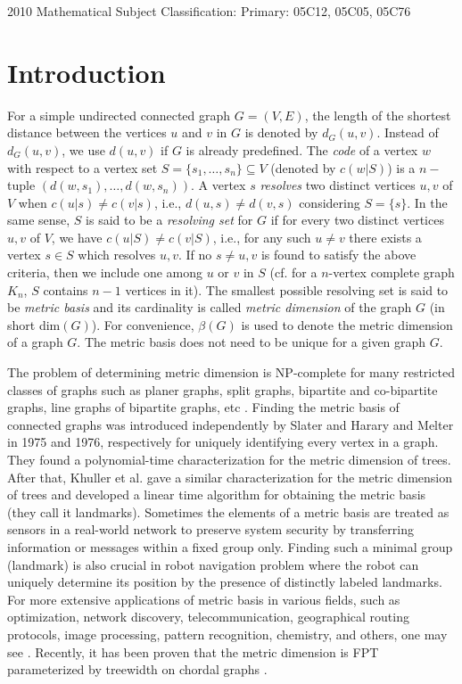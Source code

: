\documentclass{article}
\theoremstyle{definition}
\numberwithin{equation}{section}
\begin{document}
\noindent
{\scriptsize 2010 Mathematical Subject Classification:} {\footnotesize Primary:
05C12, 05C05, 05C76}

\section{Introduction}
\noindent For a simple undirected connected graph $G=(V,E)$, the length of the shortest distance between the vertices $u$ and $v$ in $G$ is denoted 
by $d_{G}(u,v)$. Instead of $d_{G}(u,v)$, we use $d(u,v)$ if $G$ is already predefined. The {\em code} of a vertex $w$ with respect to a vertex set $S=\{s_{1},\hdots,s_{n}\}\subseteq V$ (denoted by $c(w|S)$) is a $n-$tuple $(d(w,s_{1}),\hdots,d(w,s_{n}))$. A vertex $s$ {\em resolves} two distinct vertices $u,v$ of $V$ when $c(u|s)\neq c(v|s)$, i.e., $d(u,s)\neq d(v,s)$ considering $S=\{s\}$. In the same sense, $S$ is said to be a {\em resolving set} for $G$ if for every two distinct vertices $u,v$ of $V$, we have $c(u|S)\neq c(v|S)$, i.e., for any such $u\neq v$ there exists a vertex $s\in S$ which resolves $u,v$. If no $s\neq u,v$ is found to satisfy the above criteria, then we include one among $u$ or $v$ in $S$ (cf. for a $n$-vertex complete graph $K_{n}$, $S$ contains $n-1$ vertices in it). The smallest possible resolving set is said to be {\em metric basis} and its cardinality is called {\em metric dimension} of the graph $G$ (in short dim${(G)}$). For convenience, $\beta{(G)}$ is used to denote the metric dimension of a graph $G$. The metric basis does not need to be unique for a given graph $G$.



\vspace{0.5em}
 The problem of determining metric dimension is NP-complete for many restricted classes of graphs such as planer graphs, split graphs, bipartite and co-bipartite graphs, line graphs of bipartite graphs, etc \cite{GJ}. Finding the metric basis of connected graphs was introduced independently by Slater \cite{S} and Harary and Melter \cite{HM} in 1975 and 1976, respectively for uniquely identifying every vertex in a graph. They found a polynomial-time characterization for the metric dimension of trees. After that, Khuller et al. \cite{K} gave a similar characterization for the metric dimension of trees and developed a linear time algorithm for obtaining the metric basis (they call it landmarks). Sometimes the elements of a metric basis are treated as sensors \cite{CZ} in a real-world network to preserve system security by transferring information or messages within a fixed group only. Finding such a minimal group (landmark) is also crucial in robot navigation problem \cite{K} where the robot can uniquely determine its position by the presence of distinctly labeled landmarks. For more extensive applications of metric basis in various fields, such as optimization, network discovery, telecommunication, geographical routing protocols, image processing, pattern recognition, chemistry, and others, one may see \cite{BEE, CEJO, JRA, KRR, LG, MT, St}. Recently, it has been proven that the metric dimension is FPT parameterized by treewidth on chordal graphs \cite{BDP}.
\end{document}
